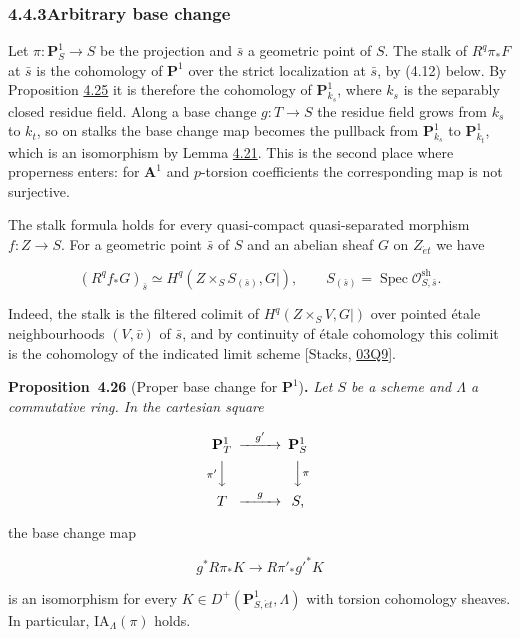 \documentclass[11pt]{article}
\newenvironment{bpstatement}[2]{\par\addvspace{0.6\baselineskip}\noindent\textbf{#1}#2\textbf{.}\enspace\ignorespaces}
  {\par\addvspace{0.4\baselineskip}}
\newenvironment{bpstatementit}[2]{\begin{bpstatement}{#1}{#2}\itshape\ignorespaces}{\end{bpstatement}}
\begin{document}
\subsubsection*{\texorpdfstring{4.4.3\quad Arbitrary base change}{4.4.3 Arbitrary base change}}
\label{bp74}%
\label{bp75}%
Let \(\pi:\mathbf P^1_S\to S\) be the projection and \(\bar s\) a geometric point of \(S\). The stalk of \(R^q\pi_*F\) at \(\bar s\) is the cohomology of \(\mathbf P^1\) over the strict localization at \(\bar s\), by (4.12) below. By Proposition \hyperref[bp71]{4.25} it is therefore the cohomology of \(\mathbf P^1_{k_s}\), where \(k_s\) is the separably closed residue field. Along a base change \(g:T\to S\) the residue field grows from \(k_s\) to \(k_t\), so on stalks the base change map becomes the pullback from \(\mathbf P^1_{k_s}\) to \(\mathbf P^1_{k_t}\), which is an isomorphism by Lemma \hyperref[bp60]{4.21}. This is the second place where properness enters: for \(\mathbf A^1\) and \(p\)-torsion coefficients the corresponding map is not surjective.

The stalk formula holds for every quasi-compact quasi-separated morphism \(f:Z\to S\). For a geometric point \(\bar s\) of \(S\) and an abelian sheaf \(G\) on \(Z_{\acute{e}t}\) we have

\[
(R^qf_*G)_{\bar s}
\simeq H^q(Z\times_SS_{(\bar s)},G|),\qquad
S_{(\bar s)}=\operatorname{Spec}\mathcal O^{\mathrm{sh}}_{S,\bar s}.
\tag{4.12}
\]

Indeed, the stalk is the filtered colimit of \(H^q(Z\times_SV,G|)\) over pointed étale neighbourhoods \((V,\bar v)\) of \(\bar s\), and by continuity of étale cohomology this colimit is the cohomology of the indicated limit scheme [Stacks, \href{https://stacks.math.columbia.edu/tag/03Q9}{03Q9}].

\label{bp76}%
\begin{bpstatementit}{Proposition~4.26}{ (Proper base change for $\mathbf P^1$)}
Let \(S\) be a scheme and \(\Lambda\) a commutative ring.  In the cartesian square

\[
\begin{CD}
\mathbf P^1_T @>{g'}>> \mathbf P^1_S\\
@V{\pi'}VV @VV{\pi}V\\
T @>{g}>> S,
\end{CD}
\]

the base change map

\[
g^*R\pi_*K\longrightarrow R\pi'_*g'^*K
\]

is an isomorphism for every \(K\in D^+(\mathbf P^1_{S,\acute{e}t},\Lambda)\) with torsion cohomology sheaves. In particular, \(\mathrm{IA}_\Lambda(\pi)\) holds.
\end{bpstatementit}
\end{document}
